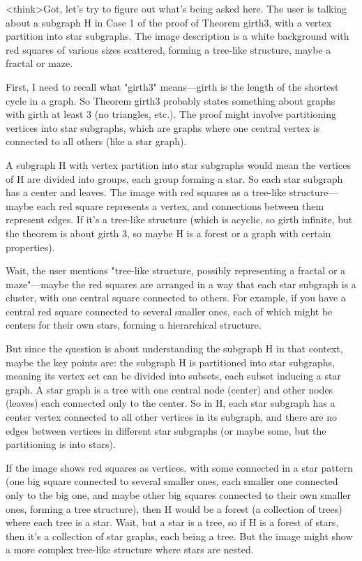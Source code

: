 <think>Got, let's try to figure out what's being asked here. The user is talking about a subgraph H in Case 1 of the proof of Theorem girth3, with a vertex partition into star subgraphs. The image description is a white background with red squares of various sizes scattered, forming a tree-like structure, maybe a fractal or maze. 

First, I need to recall what "girth3" means—girth is the length of the shortest cycle in a graph. So Theorem girth3 probably states something about graphs with girth at least 3 (no triangles, etc.). The proof might involve partitioning vertices into star subgraphs, which are graphs where one central vertex is connected to all others (like a star graph). 

A subgraph H with vertex partition into star subgraphs would mean the vertices of H are divided into groups, each group forming a star. So each star subgraph has a center and leaves. The image with red squares as a tree-like structure—maybe each red square represents a vertex, and connections between them represent edges. If it's a tree-like structure (which is acyclic, so girth infinite, but the theorem is about girth 3, so maybe H is a forest or a graph with certain properties). 

Wait, the user mentions "tree-like structure, possibly representing a fractal or a maze"—maybe the red squares are arranged in a way that each star subgraph is a cluster, with one central square connected to others. For example, if you have a central red square connected to several smaller ones, each of which might be centers for their own stars, forming a hierarchical structure. 

But since the question is about understanding the subgraph H in that context, maybe the key points are: the subgraph H is partitioned into star subgraphs, meaning its vertex set can be divided into subsets, each subset inducing a star graph. A star graph is a tree with one central node (center) and other nodes (leaves) each connected only to the center. So in H, each star subgraph has a center vertex connected to all other vertices in its subgraph, and there are no edges between vertices in different star subgraphs (or maybe some, but the partitioning is into stars). 

If the image shows red squares as vertices, with some connected in a star pattern (one big square connected to several smaller ones, each smaller one connected only to the big one, and maybe other big squares connected to their own smaller ones, forming a tree structure), then H would be a forest (a collection of trees) where each tree is a star. Wait, but a star is a tree, so if H is a forest of stars, then it's a collection of star graphs, each being a tree. But the image might show a more complex tree-like structure where stars are nested. 

